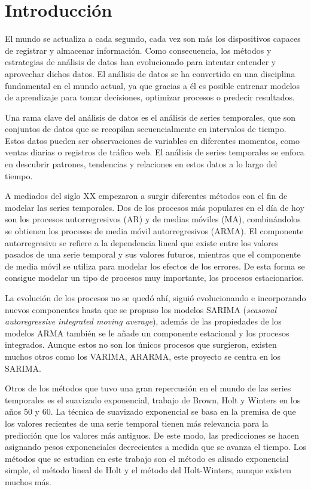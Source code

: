 \documentclass[12pt,twoside]{article}
\begin{document}
\newpage
\section{Introducción}
El mundo se actualiza a cada segundo, cada vez son más los dispositivos capaces de registrar y almacenar información.  Como consecuencia, los métodos y estrategias de análisis de datos han evolucionado para intentar entender y aprovechar dichos datos. El análisis de datos se ha convertido en una disciplina fundamental en el mundo actual, ya que gracias a él es posible entrenar modelos de aprendizaje para tomar decisiones, optimizar procesos o predecir resultados.

Una rama clave del análisis de datos es el análisis de series temporales, que son conjuntos de datos que se recopilan secuencialmente en intervalos de tiempo. Estos datos pueden ser observaciones de variables en diferentes momentos, como ventas diarias o registros de tráfico web. El análisis de series temporales se enfoca en descubrir patrones, tendencias y relaciones en estos datos a lo largo del tiempo.

A mediados del siglo XX empezaron a surgir diferentes métodos con el fin de modelar las series temporales. Dos de los procesos más populares en el día de hoy son los procesos autorregresivos (AR) y de medias móviles (MA), combinándolos se obtienen los procesos de media móvil autorregresivos (ARMA). El componente autorregresivo se refiere a la dependencia lineal que existe entre los valores pasados de una serie temporal y sus valores futuros, mientras que el componente de media móvil se utiliza para modelar los efectos de los errores. De esta forma se consigue modelar un tipo de procesos muy importante, los procesos estacionarios.

La evolución de los procesos no se quedó ahí, siguió evolucionando e incorporando nuevos componentes hasta que se propuso los modelos SARIMA (\emph{seasonal autoregressive integrated moving average}), además de las propiedades de los modelos ARMA también se le añade un componente estacional y los procesos integrados. Aunque estos no son los únicos procesos que surgieron, existen muchos otros como los VARIMA, ARARMA, este proyecto se centra en los SARIMA.

Otros de los métodos que tuvo una gran repercusión en el mundo de las series temporales es el suavizado exponencial, trabajo de Brown, Holt y Winters en los años 50 y 60. La técnica de suavizado exponencial se basa en la premisa de que los valores recientes de una serie temporal tienen más relevancia para la predicción que los valores más antiguos. De este modo, las predicciones se hacen asignando pesos exponenciales decrecientes a medida que se avanza el tiempo. Los métodos que se estudian en este trabajo son el método es alisado exponencial simple, el método lineal de Holt y el método del Holt-Winters, aunque existen muchos más.
\end{document}
